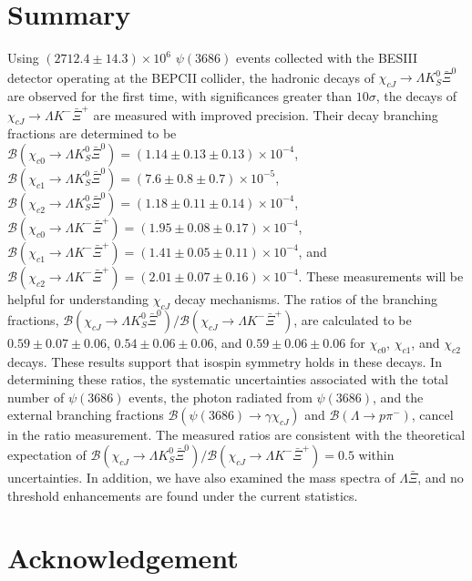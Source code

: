 \documentclass[amsmath,amssymb,twocolumn,prd,floatfix,showpacs,nofootinbib]{revtex4-1}
\begin{document}
\section{Summary}

Using $(2712.4\pm14.3)\times10^6$ $\psi(3686)$ events collected with the BESIII detector operating at the BEPCII collider,
the hadronic decays of $\chi_{cJ}\to \Lambda K^0_S\bar \Xi^0$ are observed for the first time, with  significances greater than $10\sigma$,
the decays of $\chi_{cJ}\to \Lambda K^-\bar \Xi^+$ are measured with improved precision.
Their decay branching fractions are determined to be
$\mathcal{B}(\chi_{c0}\to \Lambda K^0_S\bar \Xi^0)=(1.14\pm0.13\pm0.13)\times10^{-4}$,
$\mathcal{B}(\chi_{c1}\to \Lambda K^0_S\bar \Xi^0)=(7.6\pm0.8\pm0.7)\times10^{-5}$,
$\mathcal{B}(\chi_{c2}\to \Lambda K^0_S\bar \Xi^0)=(1.18\pm0.11\pm0.14)\times10^{-4}$,
$\mathcal{B}(\chi_{c0}\to \Lambda K^-\bar \Xi^+)=(1.95\pm0.08\pm0.17)\times10^{-4}$,
$\mathcal{B}(\chi_{c1}\to \Lambda K^-\bar \Xi^+)=(1.41\pm0.05\pm0.11)\times10^{-4}$, and 
$\mathcal{B}(\chi_{c2}\to \Lambda K^-\bar \Xi^+)=(2.01\pm0.07\pm0.16)\times10^{-4}$.
These measurements will be helpful for understanding $\chi_{cJ}$ decay mechanisms. 
The ratios of the branching fractions, ${\mathcal B}(\chi_{cJ}\to\Lambda K^0_S\bar{\Xi}^0)/{\mathcal B}(\chi_{cJ}\to\Lambda K^-\bar{\Xi}^+)$, are calculated to be $0.59\pm0.07\pm0.06$, $0.54\pm0.06\pm0.06$, and $0.59\pm0.06\pm0.06$ for $\chi_{c0}$, $\chi_{c1}$, and $\chi_{c2}$ decays. These results support that isospin symmetry holds in these decays. In determining these ratios, the systematic uncertainties associated with the total number of $\psi(3686)$ events, the photon radiated from $\psi(3686)$, and the external branching fractions $\mathcal B(\psi(3686)\to \gamma \chi_{cJ})$ and $\mathcal B(\Lambda \to p\pi^-)$, cancel in the ratio measurement. The measured ratios are consistent with the theoretical expectation of ${\mathcal B}(\chi_{cJ}\to\Lambda K^0_S\bar{\Xi}^0)/{\mathcal B}(\chi_{cJ}\to\Lambda K^-\bar{\Xi}^+)=0.5$ within uncertainties. In addition, we have also examined the mass spectra of $\Lambda \bar \Xi$, and no threshold enhancements are found under the current statistics.

\section{Acknowledgement}
\end{document}
